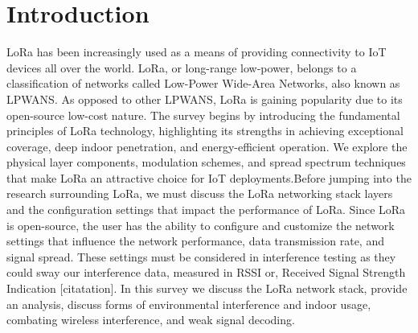 \documentclass[sigsmall]{acmart}
\begin{document}
\section*{Introduction}
LoRa has been increasingly used as a means of providing connectivity to IoT devices all over the world. LoRa, or long-range low-power, belongs to a classification of networks called Low-Power Wide-Area Networks, also known as LPWANS. As opposed to other LPWANS, LoRa is gaining popularity due to its open-source low-cost nature. The survey begins by introducing the fundamental principles of LoRa technology, highlighting its strengths in achieving exceptional coverage, deep indoor penetration, and energy-efficient operation. We explore the physical layer components, modulation schemes, and spread spectrum techniques that make LoRa an attractive choice for IoT deployments.Before jumping into the research surrounding LoRa, we must discuss the LoRa networking stack layers and the configuration settings that impact the performance of LoRa. Since LoRa is open-source, the user has the ability to configure and customize the network settings that influence the network performance, data transmission rate, and signal spread. These settings must be considered in interference testing as they could sway our interference data, measured in RSSI or, Received Signal Strength Indication [citatation]. In this survey we discuss the LoRa network stack, provide an analysis, discuss forms of environmental interference and indoor usage, combating wireless interference, and weak signal decoding.
\end{document}
